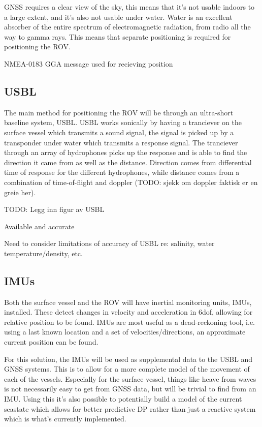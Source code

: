 \documentclass[class=article, crop=false, draft=true]{standalone}
\begin{document}
GNSS requires a clear view of the sky, this means that it's not usable indoors to a large extent, and it's also not usable under water. Water is an excellent absorber of the entire spectrum of electromagnetic radiation, from radio all the way to gamma rays. This means that separate positioning is required for positioning the ROV.

NMEA-0183 GGA message used for recieving position

\subsection{USBL}
\label{sec:usbl}
The main method for positioning the ROV will be through an ultra-short baseline system, USBL. USBL works sonically by having a tranciever on the surface vessel which transmits a sound signal, the signal is picked up by a transponder under water which transmits a response signal. The tranciever through an array of hydrophones picks up the response and is able to find the direction it came from as well as the distance. Direction comes from differential time of response for the different hydrophones, while distance comes from a combination of time-of-flight and doppler (TODO: sjekk om doppler faktisk er en greie her).

TODO: Legg inn figur av USBL

Available and accurate

Need to consider limitations of accuracy of USBL re: salinity, water temperature/density, etc.

\subsection{IMUs}
Both the surface vessel and the ROV will have inertial monitoring units, IMUs, installed. These detect changes in velocity and acceleration in 6dof, allowing for relative position to be found. IMUs are most useful as a dead-reckoning tool, i.e. using a last known location and a set of velocities/directions, an approximate current position can be found.

For this solution, the IMUs will be used as supplemental data to the USBL and GNSS systems. This is to allow for a more complete model of the movement of each of the vessels. Especially for the surface vessel, things like heave from waves is not necessarily easy to get from GNSS data, but will be trivial to find from an IMU. Using this it's also possible to potentially build a model of the current seastate which allows for better predictive DP rather than just a reactive system which is what's currently implemented.
\end{document}
